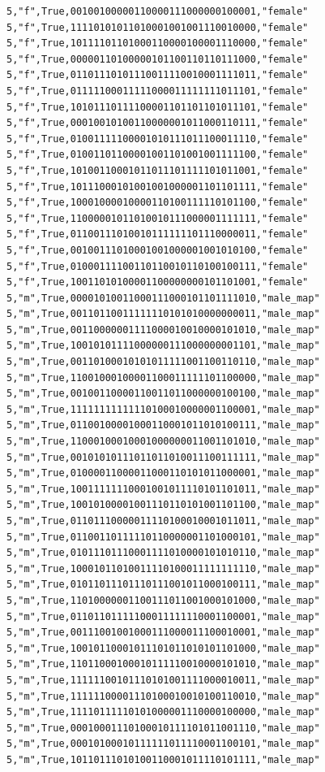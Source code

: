 \documentclass[authoryearcitations]{UoYCSproject}
\begin{document}
\begin{framed}
\begin{verbatim}
5,"f",True,00100100000110000111000000100001,"female"
5,"f",True,11110101011010001001001110010000,"female"
5,"f",True,10111101101000110000100001110000,"female"
5,"f",True,00000110100000101100110110111000,"female"
5,"f",True,01101110101110011110010001111011,"female"
5,"f",True,01111100011111000011111111011101,"female"
5,"f",True,10101110111100001101101101011101,"female"
5,"f",True,00010010100110000001011000110111,"female"
5,"f",True,01001111100001010111011100011110,"female"
5,"f",True,01001101100001001101001001111100,"female"
5,"f",True,10100110001011011101111101011001,"female"
5,"f",True,10111000101001001000001101101111,"female"
5,"f",True,10001000010000110100111110101100,"female"
5,"f",True,11000001011010010111000001111111,"female"
5,"f",True,01100111010010111111101110000011,"female"
5,"f",True,00100111010001001000001001010100,"female"
5,"f",True,01000111100110110010110100100111,"female"
5,"f",True,10011010100001100000000101101001,"female"
5,"m",True,00001010011000111000101101111010,"male_map"
5,"m",True,00110110011111110101010000000011,"male_map"
5,"m",True,00110000001111000010010000101010,"male_map"
5,"m",True,10010101111000000111000000001101,"male_map"
5,"m",True,00110100010101011111001100110110,"male_map"
5,"m",True,11001000100001100011111101100000,"male_map"
5,"m",True,00100110000110011011000000100100,"male_map"
5,"m",True,11111111111110100010000001100001,"male_map"
5,"m",True,01100100001000110001011010100111,"male_map"
5,"m",True,11000100010001000000011001101010,"male_map"
5,"m",True,00101010111011011010011100111111,"male_map"
5,"m",True,01000011000011000110101011000001,"male_map"
5,"m",True,10011111110001001011110101101011,"male_map"
5,"m",True,10010100001001110110101001101100,"male_map"
5,"m",True,01101110000011110100010001011011,"male_map"
5,"m",True,01100110111110110000001101000101,"male_map"
5,"m",True,01011101110001111010000101010110,"male_map"
5,"m",True,10001011010011110100011111111110,"male_map"
5,"m",True,01011011101110111001011000100111,"male_map"
5,"m",True,11010000001100111011001000101000,"male_map"
5,"m",True,01101101111100011111110001100001,"male_map"
5,"m",True,00111001001000111000011100010001,"male_map"
5,"m",True,10010110001011101011010101101000,"male_map"
5,"m",True,11011000100010111110010000101010,"male_map"
5,"m",True,11111100101110101001111000010011,"male_map"
5,"m",True,11111100001110100010010100110010,"male_map"
5,"m",True,11110111110101000001110000100000,"male_map"
5,"m",True,00010001110100010111101011001110,"male_map"
5,"m",True,00010100010111111011110001100101,"male_map"
5,"m",True,10110111010100110001011110101111,"male_map"

\end{verbatim}
\end{framed}
\end{document}
